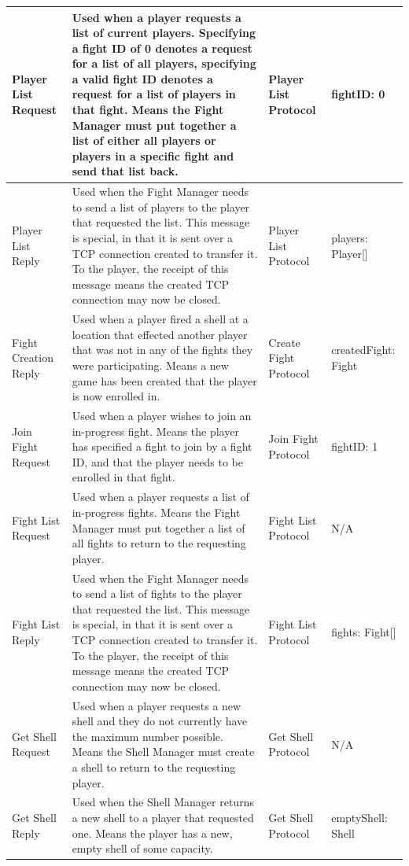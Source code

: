 \documentclass[12pt]{article}
\begin{document}
\begin{supertabular}{|p{2cm}|p{5cm}|p{3cm}|p{4cm}|}
				Player List Request&Used when a player requests a list of current players. Specifying a fight ID of 0 denotes a request for a list of all players, specifying a valid fight ID denotes a request for a list of players in that fight. Means the Fight Manager must put together a list of either all players or players in a specific fight and send that list back.&Player List Protocol&fightID: 0\\ \hline
				Player List Reply&Used when the Fight Manager needs to send a list of players to the player that requested the list. This message is special, in that it is sent over a TCP connection created to transfer it. To the player, the receipt of this message means the created TCP connection may now be closed.&Player List Protocol&players: Player[]\\ \hline
				
				Fight Creation Reply&Used when a player fired a shell at a location that effected another player that was not in any of the fights they were participating. Means a new game has been created that the player is now enrolled in.&Create Fight Protocol&createdFight: Fight\\ \hline
				
				Join Fight Request&Used when a player wishes to join an in-progress fight. Means the player has specified a fight to join by a fight ID, and that the player needs to be enrolled in that fight.&Join Fight Protocol&fightID: 1\\ \hline
				
				Fight List Request&Used when a player requests a list of in-progress fights. Means the Fight Manager must put together a list of all fights to return to the requesting player.&Fight List Protocol&N/A\\ \hline %
				Fight List Reply&Used when the Fight Manager needs to send a list of fights to the player that requested the list. This message is special, in that it is sent over a TCP connection created to transfer it. To the player, the receipt of this message means the created TCP connection may now be closed.&Fight List Protocol&fights: Fight[]\\ \hline
				
				Get Shell Request&Used when a player requests a new shell and they do not currently have the maximum number possible. Means the Shell Manager must create a shell to return to the requesting player.&Get Shell Protocol&N/A\\ \hline
				Get Shell Reply&Used when the Shell Manager returns a new shell to a player that requested one. Means the player has a new, empty shell of some capacity.&Get Shell Protocol&emptyShell: Shell\\ \hline
				

\end{supertabular}
\end{document}
